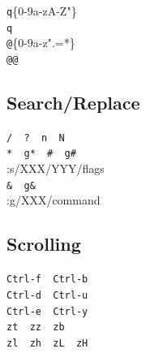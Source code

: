 \documentclass[14pt,svgnames,compress]{beamer}
\newcommand\hl[1]{\textcolor{HlColor}{#1}}
\newcommand\framesubtitlefontsize{\huge}
\newcommand\singleframesubtitle[1]{
    \begin{center}
        \framesubtitlefontsize #1
    \end{center}
}
\newcommand\subtitleframe{
    \begin{frame}
        \singleframesubtitle{\insertsubsectionhead}
    \end{frame}
}
\begin{document}
\subtitleframe

\begin{frame}[fragile]
    \begin{spacing}{1.5} %
        \Large
        \centering
        \verb|q|\hl{\{0-9a-zA-Z"\}} \\
        \verb|q| \\
        \verb|@|\hl{\{0-9a-z".=*\}} \\
        \verb|@@| \\
    \end{spacing}
\end{frame}


\subsection{Search/Replace}

\subtitleframe

\begin{frame}[fragile]
    \begin{spacing}{1.5} %
        \Large
        \centering
        \verb|/  ?  n  N| \\ \bigskip
        \verb|*  g*  #  g#| \\
        \vspace{1cm}
        \normalsize
        :\hl{s}/XXX/YYY/\hl{flags} \\
        \verb|&  g&| \\
        :\hl{g}/XXX/\hl{command} \\
    \end{spacing}
\end{frame}


\subsection{Scrolling}

\subtitleframe

\begin{frame}[fragile]
    \begin{spacing}{1.5} %
        \Large
        \centering
        \verb|Ctrl-f  Ctrl-b| \\
        \verb|Ctrl-d  Ctrl-u| \\
        \verb|Ctrl-e  Ctrl-y| \\ \bigskip
        \verb|zt  zz  zb| \\
        \verb|zl  zh  zL  zH| \\
    \end{spacing}
\end{frame}
\end{document}
